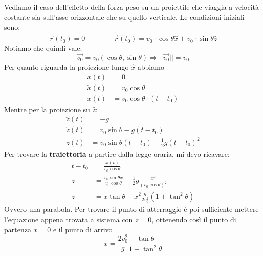 \begin{example}[Proiettile]
	Vediamo il caso dell'effetto della forza peso su un proiettile che viaggia a velocità costante sia sull'asse orizzontale che su quello verticale. Le condizioni iniziali sono:
	\begin{equation*}
		\vec{r}(t_0) = 0 \qquad\qquad \dot{\vec{r}}(t_0) = v_0 \cdot \cos\theta\widehat{x} + v_0 \cdot \sin\theta\widehat{z}
	\end{equation*}
	Notiamo che quindi vale:
	\begin{equation*}
		\vec{v_0}=v_0(\cos\theta, \sin\theta) \Longrightarrow \lvert\lvert \vec{v_0} \rvert\rvert = v_0
	\end{equation*}
	Per quanto riguarda la proiezione lungo $\widehat{x}$ abbiamo
	\begin{align*}
		\ddot{x}(t) & = 0 \\
		\dot{x}(t) & = v_0\cos\theta \\
		x(t) & = v_0\cos\theta \cdot (t-t_0)
	\end{align*}
	Mentre per la proiezione su $\widehat{z}$:
	\begin{align*}
		\ddot{z}(t) & = -g \\
		\dot{z}(t) & = v_0\sin\theta - g(t-t_0)\\
		z(t) & = v_0\sin\theta (t-t_0) - \frac{1}{2}g(t-t_0) ^2
	\end{align*}
	Per trovare la \textbf{traiettoria} a partire dalla legge oraria, mi devo ricavare:
	\begin{align*}
		t-t_0 & = \frac{x(t)}{v_0\cos\theta} \\
		z & = \frac{v_0 \sin\theta x}{v_0 \cos\theta} - \frac{1}{2}g \frac{x^2}{(v_0\cos\theta)^2} \\
		z & = x \tan\theta - x^2 \frac{g}{2v_0^2}(1+\tan^2\theta)
	\end{align*}
	Ovvero una parabola. Per trovare il punto di atterraggio è poi sufficiente mettere l'equazione appena trovata a sistema con $z=0$, ottenendo così il punto di partenza $x=0$ e il punto di arrivo
	\begin{equation*}
		x = \frac{2 v_0^2}{g}\frac{\tan\theta}{1+\tan^2\theta}
	\end{equation*}
\end{example}

